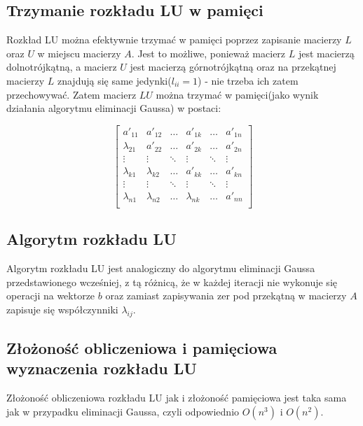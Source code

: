 \documentclass{article}
\begin{document}
\subsection{Trzymanie rozkładu LU w pamięci}
Rozkład LU można efektywnie trzymać w pamięci poprzez zapisanie macierzy $L$ oraz $U$ w miejscu macierzy $A$.
Jest to możliwe, ponieważ macierz $L$ jest macierzą dolnotrójkątną, a macierz $U$ jest macierzą górnotrójkątną oraz na przekątnej macierzy $L$ znajdują się same jedynki($l_{ii} = 1$) - nie trzeba ich zatem przechowywać.
Zatem macierz $LU$ można trzymać w pamięci(jako wynik działania algorytmu eliminacji Gaussa) w postaci:
\begin{center}
    $$
    \begin{bmatrix}
        a'_{11} & a'_{12} & \dots & a'_{1k} & \dots & a'_{1n} \\
        \lambda_{21} & a'_{22} & \dots & a'_{2k} & \dots & a'_{2n} \\
        \vdots & \vdots & \ddots &\vdots & \ddots & \vdots \\
        \lambda_{k1} & \lambda_{k2} & \dots & a'_{kk} & \dots & a'_{kn} \\
        \vdots & \vdots & \ddots & \vdots & \ddots & \vdots \\
        \lambda_{n1} & \lambda_{n2} & \dots & \lambda_{nk} & \dots & a'_{nn} \\
    \end{bmatrix}
    $$
\end{center}

\subsection{Algorytm rozkładu LU}
Algorytm rozkładu LU jest analogiczny do algorytmu eliminacji Gaussa przedstawionego wcześniej, z tą różnicą, że w każdej iteracji nie wykonuje się operacji na wektorze $b$
oraz zamiast zapisywania zer pod przekątną w macierzy $A$ zapisuje się współczynniki $\lambda_{ij}$.

\subsection{Złożoność obliczeniowa i pamięciowa wyznaczenia rozkładu LU}
Złożoność obliczeniowa rozkładu LU jak i złożoność pamięciowa jest taka sama jak w przypadku eliminacji Gaussa, czyli odpowiednio $O(n^3)$ i $O(n^2)$.
\end{document}
